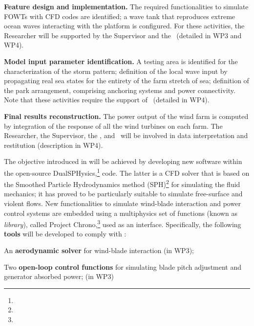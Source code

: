 \begin{description}[noitemsep,topsep=1pt,leftmargin=2pt,]
    \item[\hlred{\small BoW\,1}] \textbf{Feature design and implementation.} The required functionalities to simulate FOWTs with CFD codes are identified; a wave tank that reproduces extreme ocean waves interacting with the platform is configured. For these activities, the Researcher will be supported by the Supervisor and the \Gop\ (detailed in WP3 and WP4).
    \item[\hlred{\small BoW\,2}] \textbf{Model input parameter identification.} A testing area is identified for the characterization of the storm pattern; definition of the local wave input by propagating real sea states for the entirety of the farm stretch of sea; definition of the park arrangement, comprising anchoring systems and power connectivity. Note that these activities require the support of \Hexicon\ (detailed in WP4).
    \item[\hlred{\small BoW\,3}] \textbf{Final results reconstruction.} The power output of the wind farm is computed by integration of the response of all the wind turbines on each farm. The Researcher, the Supervisor, the \Gop, and \Hexicon\ will be involved in data interpretation and restitution (description in WP4).
\end{description}

The objective introduced in  will be achieved by developing new software within the open-source DualSPHysics,\footnote{} code. The latter is a CFD solver that is based on the Smoothed Particle Hydrodynamics method (SPH)\footnote{} for simulating the fluid mechanics; it has proved to be particularly suitable to simulate free-surface and violent flows. New functionalities to simulate wind-blade interaction and power control systems are embedded using a multiphysics set of functions (known as \textit{library}), called Project Chrono,\footnote{} used as an interface.
Specifically, the following \textbf{tools} will be developed to comply with :
\begin{description}[noitemsep,topsep=1pt,leftmargin=2pt,]
    \item[\hlred{\small Tool\,1}] An \textbf{aerodynamic solver} for wind-blade interaction (in WP3);
    \item[\hlred{\small Tool\,2}] Two \textbf{open-loop control functions} for simulating blade pitch adjustment and generator absorbed power; (in WP3)
\end{description}

